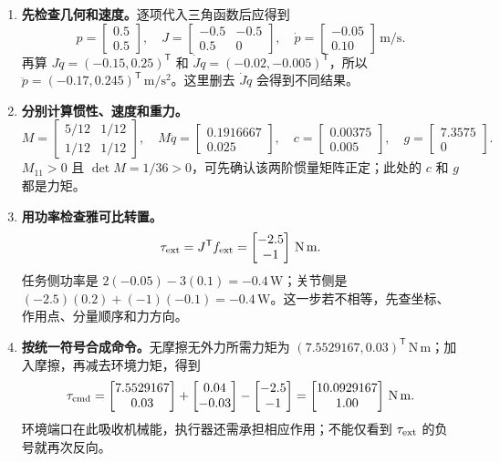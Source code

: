 \begin{enumerate}
\item \textbf{先检查几何和速度。}逐项代入三角函数后应得到
\[
p=\begin{bmatrix}0.5\\0.5\end{bmatrix},\quad
J=\begin{bmatrix}-0.5&-0.5\\0.5&0\end{bmatrix},\quad
\dot p=\begin{bmatrix}-0.05\\0.10\end{bmatrix}\,\mathrm{m/s}.
\]
再算 $J\ddot q=(-0.15,0.25)^{\mathsf T}$ 和
$\dot J\dot q=(-0.02,-0.005)^{\mathsf T}$，所以
$\ddot p=(-0.17,0.245)^{\mathsf T}\,\mathrm{m/s^2}$。这里删去 $\dot J\dot q$ 会得到不同结果。

\item \textbf{分别计算惯性、速度和重力。}
\[
M=\begin{bmatrix}5/12&1/12\\1/12&1/12\end{bmatrix},\quad
M\ddot q=\begin{bmatrix}0.1916667\\0.025\end{bmatrix},\quad
c=\begin{bmatrix}0.00375\\0.005\end{bmatrix},\quad
g=\begin{bmatrix}7.3575\\0\end{bmatrix}.
\]
$M_{11}>0$ 且 $\det M=1/36>0$，可先确认该两阶惯量矩阵正定；此处的 $c$ 和 $g$ 都是力矩。

\item \textbf{用功率检查雅可比转置。}
\[
\tau_{\rm ext}=J^{\mathsf T}f_{\rm ext}
=\begin{bmatrix}-2.5\\-1\end{bmatrix}\,\mathrm{N\,m}.
\]
任务侧功率是 $2(-0.05)-3(0.1)=-0.4\,\mathrm W$；关节侧是
$(-2.5)(0.2)+(-1)(-0.1)=-0.4\,\mathrm W$。这一步若不相等，先查坐标、作用点、分量顺序和力方向。

\item \textbf{按统一符号合成命令。}无摩擦无外力所需力矩为
$(7.5529167,0.03)^{\mathsf T}\,\mathrm{N\,m}$；加入摩擦，再减去环境力矩，得到
\[
\tau_{\rm cmd}
=\begin{bmatrix}7.5529167\\0.03\end{bmatrix}
+\begin{bmatrix}0.04\\-0.03\end{bmatrix}
-\begin{bmatrix}-2.5\\-1\end{bmatrix}
=\begin{bmatrix}10.0929167\\1.00\end{bmatrix}\,\mathrm{N\,m}.
\]
环境端口在此吸收机械能，执行器还需承担相应作用；不能仅看到 $\tau_{\rm ext}$ 的负号就再次反向。


\end{enumerate}
